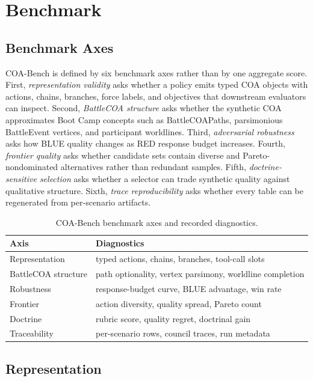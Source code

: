 \documentclass[letterpaper]{article}
\begin{document}
\section{Benchmark}

\subsection{Benchmark Axes}

COA-Bench is defined by six benchmark axes rather than by one aggregate score. First, \emph{representation validity} asks whether a policy emits typed COA objects with actions, chains, branches, force labels, and objectives that downstream evaluators can inspect. Second, \emph{BattleCOA structure} asks whether the synthetic COA approximates Boot Camp concepts such as BattleCOAPaths, parsimonious BattleEvent vertices, and participant worldlines. Third, \emph{adversarial robustness} asks how BLUE quality changes as RED response budget increases. Fourth, \emph{frontier quality} asks whether candidate sets contain diverse and Pareto-nondominated alternatives rather than redundant samples. Fifth, \emph{doctrine-sensitive selection} asks whether a selector can trade synthetic quality against qualitative structure. Sixth, \emph{trace reproducibility} asks whether every table can be regenerated from per-scenario artifacts.

\begin{table}[t]
\centering
\scriptsize
\caption{COA-Bench benchmark axes and recorded diagnostics.}
\label{tab:axes}
\begin{tabular}{@{}lp{.58\linewidth}@{}}
\toprule
Axis & Diagnostics \\
\midrule
Representation & typed actions, chains, branches, tool-call slots \\
BattleCOA structure & path optionality, vertex parsimony, worldline completion \\
Robustness & response-budget curve, BLUE advantage, win rate \\
Frontier & action diversity, quality spread, Pareto count \\
Doctrine & rubric score, quality regret, doctrinal gain \\
Traceability & per-scenario rows, council traces, run metadata \\
\bottomrule
\end{tabular}
\end{table}

\subsection{Representation}
\end{document}
